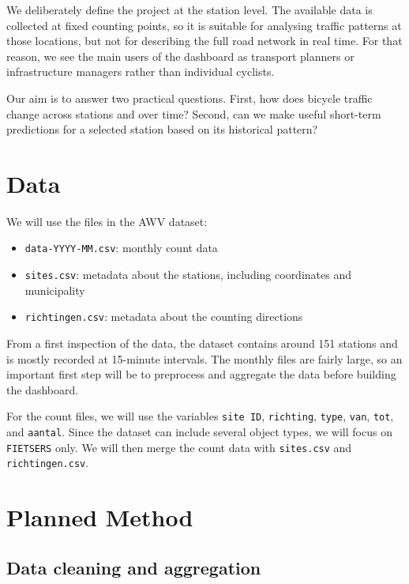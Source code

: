 \documentclass[11pt]{article}
\begin{document}
We deliberately define the project at the station level. The available data is collected at fixed counting points, so it is suitable for analysing traffic patterns at those locations, but not for describing the full road network in real time. For that reason, we see the main users of the dashboard as transport planners or infrastructure managers rather than individual cyclists.

Our aim is to answer two practical questions. First, how does bicycle traffic change across stations and over time? Second, can we make useful short-term predictions for a selected station based on its historical pattern?

\section{Data}

We will use the files in the AWV dataset:

\begin{itemize}
    \item \texttt{data-YYYY-MM.csv}: monthly count data
    \item \texttt{sites.csv}: metadata about the stations, including coordinates and municipality
    \item \texttt{richtingen.csv}: metadata about the counting directions
\end{itemize}

From a first inspection of the data, the dataset contains around 151 stations and is mostly recorded at 15-minute intervals. The monthly files are fairly large, so an important first step will be to preprocess and aggregate the data before building the dashboard.

For the count files, we will use the variables \texttt{site ID}, \texttt{richting}, \texttt{type}, \texttt{van}, \texttt{tot}, and \texttt{aantal}. Since the dataset can include several object types, we will focus on \texttt{FIETSERS} only. We will then merge the count data with \texttt{sites.csv} and \texttt{richtingen.csv}.

\section{Planned Method}

\subsection{Data cleaning and aggregation}
\end{document}
